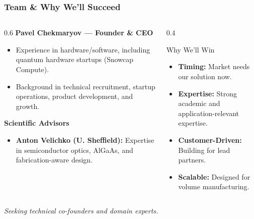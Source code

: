 \documentclass{beamer}
\begin{document}
\begin{frame}
    \frametitle{Team \& Why We'll Succeed}
    
    \begin{columns}[T]
        \begin{column}{0.6\textwidth}
            \textbf{Pavel Chekmaryov — Founder \& CEO}
            \begin{itemize}
                \item Experience in hardware/software, including quantum hardware startups (Snowcap Compute).
                \item Background in technical recruitment, startup operations, product development, and growth.
            \end{itemize}

            \textbf{Scientific Advisors}
            \begin{itemize}
                \item \textbf{Anton Velichko (U. Sheffield):} Expertise in semiconductor optics, AlGaAs, and fabrication-aware design.
            \end{itemize}
        \end{column}
        
        \begin{column}{0.4\textwidth}
            \begin{exampleblock}{Why We'll Win}
                \begin{itemize}
                    \item \textbf{Timing:} Market needs our solution now.
                    \item \textbf{Expertise:} Strong academic and application-relevant expertise.
                    \item \textbf{Customer-Driven:} Building for lead partners.
                    \item \textbf{Scalable:} Designed for volume manufacturing.
                \end{itemize}
            \end{exampleblock}
        \end{column}
    \end{columns}
    
    \vspace{0.2cm}
    \centering
    \small\textit{Seeking technical co-founders and domain experts.}
\end{frame}
\end{document}

